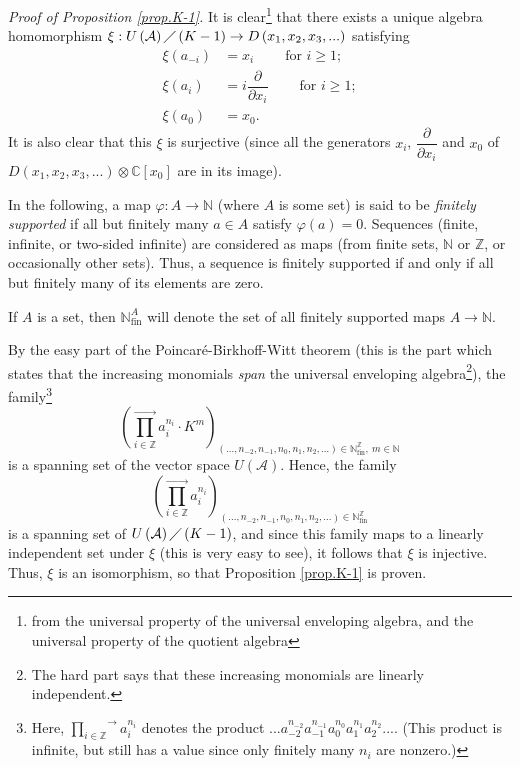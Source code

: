 \documentclass
[numbers=enddot,12pt,final,onecolumn,german,notitlepage]{scrartcl}%
\theoremstyle{definition}
\begin{document}
\textit{Proof of Proposition \ref{prop.K-1}.} It is clear\footnote{from the
universal property of the universal enveloping algebra, and the universal
property of the quotient algebra} that there exists a unique algebra
homomorphism $\xi:U\left(  \mathcal{A}\right)  \diagup\left(  K-1\right)
\rightarrow D\left(  x_{1},x_{2},x_{3},...\right)  $ satisfying%
\begin{align*}
\xi\left(  a_{-i}\right)   &  =x_{i}\ \ \ \ \ \ \ \ \ \ \text{for }i\geq1;\\
\xi\left(  a_{i}\right)   &  =i\dfrac{\partial}{\partial x_{i}}%
\ \ \ \ \ \ \ \ \ \ \text{for }i\geq1;\\
\xi\left(  a_{0}\right)   &  =x_{0}.
\end{align*}
It is also clear that this $\xi$ is surjective (since all the generators
$x_{i}$, $\dfrac{\partial}{\partial x_{i}}$ and $x_{0}$ of $D\left(
x_{1},x_{2},x_{3},...\right)  \otimes\mathbb{C}\left[  x_{0}\right]  $ are in
its image).

In the following, a map $\varphi:A\rightarrow\mathbb{N}$ (where $A$ is some
set) is said to be \textit{finitely supported} if all but finitely many $a\in
A$ satisfy $\varphi\left(  a\right)  =0$. Sequences (finite, infinite, or
two-sided infinite) are considered as maps (from finite sets, $\mathbb{N}$ or
$\mathbb{Z}$, or occasionally other sets). Thus, a sequence is finitely
supported if and only if all but finitely many of its elements are zero.

If $A$ is a set, then $\mathbb{N}_{\operatorname*{fin}}^{A}$ will denote the
set of all finitely supported maps $A\rightarrow\mathbb{N}$.

By the easy part of the Poincar\'{e}-Birkhoff-Witt theorem (this is the part
which states that the increasing monomials \textit{span} the universal
enveloping algebra\footnote{The hard part says that these increasing monomials
are linearly independent.}), the family\footnote{Here, $\overset{\rightarrow
}{\prod\limits_{i\in\mathbb{Z}}}a_{i}^{n_{i}}$ denotes the product
$...a_{-2}^{n_{-2}}a_{-1}^{n_{-1}}a_{0}^{n_{0}}a_{1}^{n_{1}}a_{2}^{n_{2}}...$.
(This product is infinite, but still has a value since only finitely many
$n_{i}$ are nonzero.)}%
\[
\left(  \overset{\rightarrow}{\prod\limits_{i\in\mathbb{Z}}}a_{i}^{n_{i}}\cdot
K^{m}\right)  _{\left(  ...,n_{-2},n_{-1},n_{0},n_{1},n_{2},...\right)
\in\mathbb{N}_{\operatorname*{fin}}^{\mathbb{Z}},\ m\in\mathbb{N}}%
\]
is a spanning set of the vector space $U\left(  \mathcal{A}\right)  $. Hence,
the family
\[
\left(  \overset{\rightarrow}{\prod\limits_{i\in\mathbb{Z}}}a_{i}^{n_{i}%
}\right)  _{\left(  ...,n_{-2},n_{-1},n_{0},n_{1},n_{2},...\right)
\in\mathbb{N}_{\operatorname*{fin}}^{\mathbb{Z}}}%
\]
is a spanning set of $U\left(  \mathcal{A}\right)  \diagup\left(  K-1\right)
$, and since this family maps to a linearly independent set under $\xi$ (this
is very easy to see), it follows that $\xi$ is injective. Thus, $\xi$ is an
isomorphism, so that Proposition \ref{prop.K-1} is proven.
\end{document}
